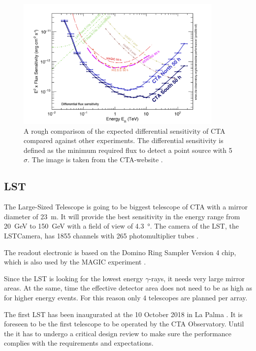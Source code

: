 \begin{figure}[H]
	\center
	\captionsetup{width=0.9\linewidth}
	\includegraphics[width=0.9\textwidth]{images/cta_performance.png}
	\caption{A rough comparison of the expected differential sensitivity of CTA compared against
	other experiments. The differential sensitivity is defined as the
	minimum required flux to detect a point source with 5$\sigma$.
	The image is taken from the CTA-website \cite{cta_web}.}
	\label{fig:cta_performance}
\end{figure}

\subsection{LST}
\label{sec:lst}
The Large-Sized Telescope is going to be biggest telescope of CTA
with a mirror diameter of \SI{23}{\meter}.
It will provide the best sensitivity in the energy range from 
\SI{20}{\giga\electronvolt} to \SI{150}{\giga\electronvolt} with a field of view of \SI{4.3}{\degree}.
The camera of the LST, the LSTCamera, has \num{1855} channels 
with \num{265} photomultiplier tubes \cite{cta_web}.

The readout electronic is based on the Domino Ring Sampler 
Version 4 chip, which is also used by the MAGIC experiment
\cite{Kubo:2013pwa}. 

Since the LST is looking for the lowest energy $\gamma$-rays, it needs
very large mirror areas. At the same, time the effective detector area does 
not need to be as high as for higher energy events.
For this reason only 4 telescopes are planned per array.

The first LST has been inaugurated at the 10 October 2018 in La Palma \cite{lst_debut}.
It is foreseen to be the first telescope to be operated by the CTA Observatory.
Until the it has to undergo a critical design review to make sure the performance 
complies with the requirements and expectations.

